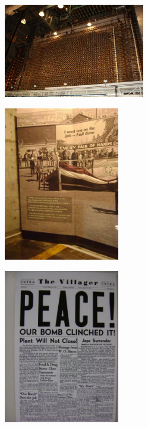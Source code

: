 \documentclass[aspectratio=1610,pdftex,dvipsnames,compress,xcolor={dvipsnames}]{beamer}
\begin{document}
\begin{frame}{}
    \begin{figure}
        \centering
        \includegraphics[width=0.55\textwidth]{hb4.jpg}
    \end{figure}
\end{frame}


\begin{frame}{}
    \begin{figure}
        \centering
        \includegraphics[width=0.45\textwidth]{hb5.jpg}
    \end{figure}
\end{frame}


\begin{frame}{}
    \begin{figure}
        \centering
        \includegraphics[width=0.45\textwidth]{hb6.jpg}
    \end{figure}
\end{frame}
\end{document}
